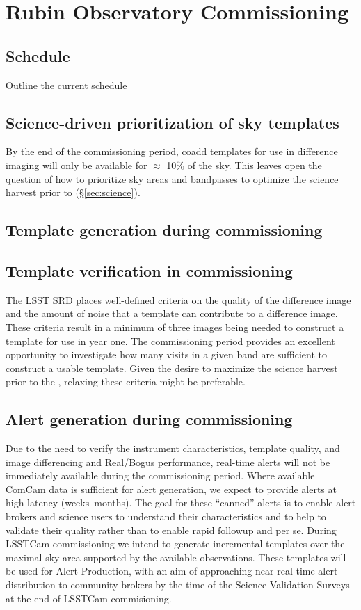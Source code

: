 \section{Rubin Observatory Commissioning} 
\label{sec:commissioning}

\subsection{Schedule}
Outline the current schedule 



\subsection{Science-driven prioritization of sky templates}
By the end of the commissioning period, coadd templates for use in difference imaging will only be available for $\approx$ 10\% of the sky. 
This leaves open the question of how to  prioritize  sky areas and bandpasses to optimize the science harvest prior to \drone (\S \ref{sec:science}).

\subsection{Template generation during commissioning}


\subsection{Template verification in commissioning}

The LSST SRD places well-defined criteria on the quality of the difference image and the amount of noise that a template can contribute to a difference image.  These criteria result in a minimum of three images being needed to construct a template for use in year one.  The commissioning period provides an excellent opportunity to investigate how many visits in a given band are sufficient to construct a usable template.  Given the desire to maximize the science harvest prior to the \drone,  relaxing these criteria might be preferable. 

\subsection{Alert generation during commissioning}

Due to the need to verify the instrument characteristics, template quality, and image differencing and Real/Bogus performance, real-time alerts will not be immediately available during the commissioning period. 
Where available ComCam data is sufficient for alert generation, we expect to provide alerts at high latency (weeks--months). 
The goal for these ``canned'' alerts is to enable alert brokers and science users to understand their characteristics and to help to validate their quality rather than to enable rapid followup and \es per se.
During LSSTCam commissioning we intend to generate incremental templates over the maximal sky area supported by the available observations.
These templates will be used for Alert Production, with an aim of approaching near-real-time alert distribution to community brokers by the time of the Science Validation Surveys at the end of LSSTCam commisioning. 
